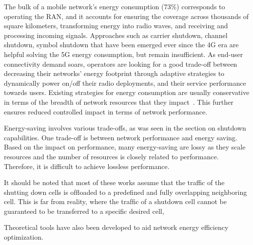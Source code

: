 The bulk of a mobile network's energy consumption (73\%) corresponds to operating the RAN, and it accounts for ensuring the coverage across thousands of square kilometers, transforming energy into radio waves, and receiving and processing incoming signals.
Approaches such as carrier shutdown, channel shutdown, symbol shutdown that have been emerged ever since the 4G era are helpful solving the 5G energy consumption, but remain insufficient. 
As end-user connectivity demand soars, operators are looking for a good trade-off between decreasing their networks' energy footprint through adaptive strategies to dynamically power on/off their radio deployments, and their service performance towards users.  
Existing strategies for energy consumption are usually conservative in terms of the breadth of network resources that they impact~\cite{Tan2022}.
This further ensures reduced controlled impact in terms of network performance. 


Energy-saving involves various trade-offs, as was seen in the section on shutdown capabilities. 
One trade-off is between network performance and energy saving. Based on the impact on performance, many energy-saving are lossy as they scale resources and the number of resources is closely related to performance. Therefore, it is difficult to achieve lossless performance\cite{Tan2022}.

It should be noted that most of these works assume that the traffic of the shutting down cells is ofﬂoaded to a predeﬁned and fully overlapping neighboring cell. This is far from reality, where the trafﬁc of a shutdown cell cannot be guaranteed to be transferred to a specific desired cell,

Theoretical tools have also been developed to aid network energy efficiency optimization. 

